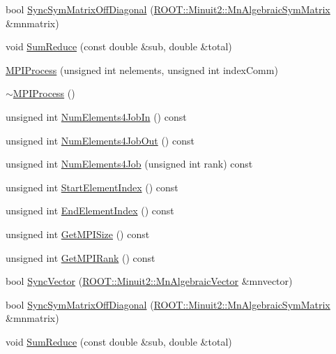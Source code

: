 \begin{DoxyCompactItemize}
\item 
bool \mbox{\hyperlink{classROOT_1_1Minuit2_1_1MPIProcess_ac00f83396ec6b7985dad640981a07657}{Sync\+Sym\+Matrix\+Off\+Diagonal}} (\mbox{\hyperlink{namespaceROOT_1_1Minuit2_a9e74ad97f5537a2e80e52b04d98ecc6e}{R\+O\+O\+T\+::\+Minuit2\+::\+Mn\+Algebraic\+Sym\+Matrix}} \&mnmatrix)
\item 
void \mbox{\hyperlink{classROOT_1_1Minuit2_1_1MPIProcess_ac28c4a6a09a1518bbfa5ed09b676bd7c}{Sum\+Reduce}} (const double \&sub, double \&total)
\item 
\mbox{\hyperlink{classROOT_1_1Minuit2_1_1MPIProcess_a43d72185b19c2e99f914ff408fd2755b}{M\+P\+I\+Process}} (unsigned int nelements, unsigned int index\+Comm)
\item 
\mbox{\hyperlink{classROOT_1_1Minuit2_1_1MPIProcess_ac2be6e4b9a721d7f1bf9512580bc113b}{$\sim$\+M\+P\+I\+Process}} ()
\item 
unsigned int \mbox{\hyperlink{classROOT_1_1Minuit2_1_1MPIProcess_ada3f8f6f1b28844db6cb6bd717521ffd}{Num\+Elements4\+Job\+In}} () const
\item 
unsigned int \mbox{\hyperlink{classROOT_1_1Minuit2_1_1MPIProcess_a8ab54fbeb2dd760265e0121573361c3f}{Num\+Elements4\+Job\+Out}} () const
\item 
unsigned int \mbox{\hyperlink{classROOT_1_1Minuit2_1_1MPIProcess_a9d9453545f311f9f9f995800ed518258}{Num\+Elements4\+Job}} (unsigned int rank) const
\item 
unsigned int \mbox{\hyperlink{classROOT_1_1Minuit2_1_1MPIProcess_a9e6b2dc6f57cc91bb11637b50ba15957}{Start\+Element\+Index}} () const
\item 
unsigned int \mbox{\hyperlink{classROOT_1_1Minuit2_1_1MPIProcess_af4445148831dec4961d5f8aa99aeb2c1}{End\+Element\+Index}} () const
\item 
unsigned int \mbox{\hyperlink{classROOT_1_1Minuit2_1_1MPIProcess_a9bd9f26ca9de3967741e014fcab5bb59}{Get\+M\+P\+I\+Size}} () const
\item 
unsigned int \mbox{\hyperlink{classROOT_1_1Minuit2_1_1MPIProcess_a86c50a55e3ae2651b74fa18443a13dd3}{Get\+M\+P\+I\+Rank}} () const
\item 
bool \mbox{\hyperlink{classROOT_1_1Minuit2_1_1MPIProcess_a179f3ea817399a73cbce05d1778ec128}{Sync\+Vector}} (\mbox{\hyperlink{namespaceROOT_1_1Minuit2_a62ed97730a1ca8d3fbaec64a19aa11c9}{R\+O\+O\+T\+::\+Minuit2\+::\+Mn\+Algebraic\+Vector}} \&mnvector)
\item 
bool \mbox{\hyperlink{classROOT_1_1Minuit2_1_1MPIProcess_ac00f83396ec6b7985dad640981a07657}{Sync\+Sym\+Matrix\+Off\+Diagonal}} (\mbox{\hyperlink{namespaceROOT_1_1Minuit2_a9e74ad97f5537a2e80e52b04d98ecc6e}{R\+O\+O\+T\+::\+Minuit2\+::\+Mn\+Algebraic\+Sym\+Matrix}} \&mnmatrix)
\item 
void \mbox{\hyperlink{classROOT_1_1Minuit2_1_1MPIProcess_ac28c4a6a09a1518bbfa5ed09b676bd7c}{Sum\+Reduce}} (const double \&sub, double \&total)
\end{DoxyCompactItemize}
